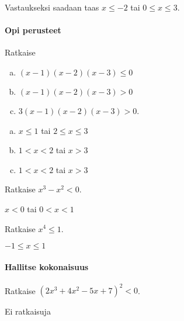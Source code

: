 Vastaukseksi saadaan taas $x\leq -2$ tai $0\leq x \leq 3$.


\Harjoitustehtavat

\paragraph*{Opi perusteet}

\begin{tehtava}
    Ratkaise
    \begin{enumerate}[a)]
        \item $(x-1)(x-2)(x-3) \le 0$
        \item $(x-1)(x-2)(x-3) > 0$
        \item $3(x-1)(x-2)(x-3) > 0$.
    \end{enumerate}
    \begin{vastaus}
        \begin{enumerate}[a)]
            \item $x \le 1$ tai $2 \le x \le 3$
            \item $1 < x < 2$ tai $x>3$
            \item $1 < x < 2$ tai $x>3$
        \end{enumerate}
    \end{vastaus}
\end{tehtava}

\begin{tehtava}
    Ratkaise $x^3-x^2<0$.
    \begin{vastaus}
    $x<0$ tai $0<x<1$
    \end{vastaus}
\end{tehtava}

\begin{tehtava}
    Ratkaise $x^4 \le 1$.
    \begin{vastaus}
       $-1 \le x \le 1$
    \end{vastaus}
\end{tehtava}


\paragraph*{Hallitse kokonaisuus}

\begin{tehtava}
    Ratkaise $(2x^3+4x^2-5x+7)^2 < 0$.
    \begin{vastaus}
       Ei ratkaisuja
    \end{vastaus}
\end{tehtava}



